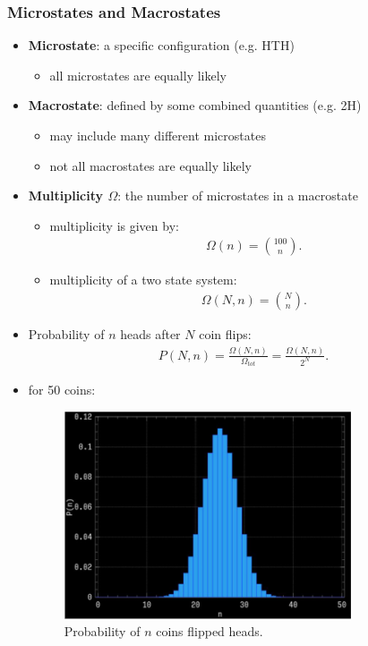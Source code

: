 \documentclass[10pt]{article}
\begin{document}
\subsubsection{Microstates and Macrostates}
\begin{itemize}
    \item \textbf{Microstate}: a specific configuration (e.g. HTH)
        \begin{itemize}
            \item all microstates are equally likely
        \end{itemize}
    \item \textbf{Macrostate}: defined by some combined quantities (e.g. 2H)
        \begin{itemize}
            \item may include many different microstates 
            \item not all macrostates are equally likely
        \end{itemize}
    \item \textbf{Multiplicity $\Omega$}: the number of microstates in a macrostate
        \begin{itemize}
            \item multiplicity is given by:
                \begin{align*}
                    \Omega (n) = {100 \choose n}
                .\end{align*}
            \item multiplicity of a two state system:
                \begin{align*}
                    \Omega(N,n) = {N \choose n}
                .\end{align*}
        \end{itemize}
    \item Probability of $n$ heads after $N$ coin flips:
        \begin{align*}
            P(N,n) = \frac{\Omega(N,n)}{\Omega_{tot}} = \frac{\Omega(N,n)}{2^N}
        .\end{align*}
    \item for 50 coins:
        \begin{figure}[h]
            \centering
            \includegraphics[width=0.8\textwidth]{probabilityDistributionCoins.png}
            \caption{Probability of $n$ coins flipped heads.}
            \label{fig:probabilityDistributionCoins}
        \end{figure}
\end{itemize}
\end{document}
